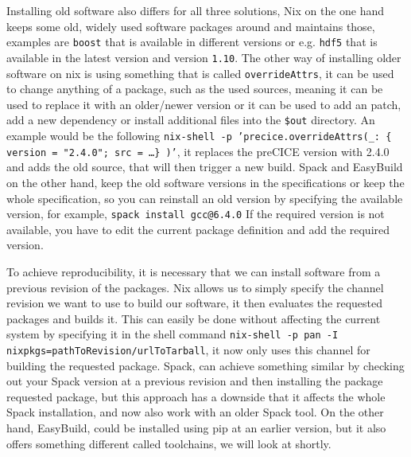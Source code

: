 \documentclass{eceasst}
\begin{document}
Installing old software also differs for all three solutions, Nix on the one hand keeps some old, widely used software packages around and maintains those, examples are \texttt{boost} that is available in different versions or e.g. \texttt{hdf5} that is available in the latest version and version \texttt{1.10}.
The other way of installing older software on nix is using something that is called \texttt{overrideAttrs}, it can be used to change anything of a package, such as the used sources, meaning it can be used to replace it with an older/newer version or it can be used to add an patch, add a new dependency or install additional files into the \texttt{\$out} directory.
An example would be the following \texttt{nix-shell -p 'precice.overrideAttrs(\_: \{ version = "2.4.0"; src = \ldots \} )'}, it replaces the preCICE version with 2.4.0 and adds the old source, that will then trigger a new build.
Spack and EasyBuild on the other hand, keep the old software versions in the specifications or keep the whole specification, so you can reinstall an old version by specifying the available version, for example, \texttt{spack install gcc@6.4.0}
If the required version is not available, you have to edit the current package definition and add the required version.

To achieve reproducibility, it is necessary that we can install software from a previous revision of the packages.
Nix allows us to simply specify the channel revision we want to use to build our software, it then evaluates the requested packages and builds it.
This can easily be done without affecting the current system by specifying it in the shell command \texttt{nix-shell -p pan -I nixpkgs=pathToRevision/urlToTarball}, it now only uses this channel for building the requested package.
Spack, can achieve something similar by checking out your Spack version at a previous revision and then installing the package requested package, but this approach has a downside that it affects the whole Spack installation, and now also work with an older Spack tool.
On the other hand, EasyBuild, could be installed using pip at an earlier version, but it also offers something different called toolchains, we will look at shortly.
\end{document}
